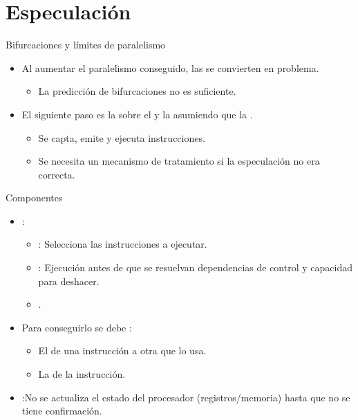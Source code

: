 \section{Especulación}

\begin{frame}[t]{Bifurcaciones y límites de paralelismo}
\begin{itemize}
  \item Al aumentar el paralelismo conseguido, las  se convierten en problema.
    \begin{itemize}
      \item La predicción de bifurcaciones no es suficiente.
    \end{itemize}

  \item El siguiente paso es la  sobre el 
         y la  
        asumiendo que la .
    \begin{itemize}
      \item Se capta, emite y ejecuta instrucciones.
      \item Se necesita un mecanismo de tratamiento si la especulación no era correcta.
    \end{itemize}
\end{itemize}
\end{frame}

\begin{frame}[t]{Componentes}
\begin{itemize}
  \item {}:
    \begin{itemize}
      \item {}: Selecciona las instrucciones a ejecutar.
      \item {}: Ejecución antes de que se resuelvan dependencias de control y capacidad para deshacer.
      \item {}.
    \end{itemize}

  \item Para conseguirlo se debe :
    \begin{itemize}
      \item El  de una instrucción a otra que lo usa.
      \item La  de la instrucción.
    \end{itemize}

  \item {}:No se actualiza el estado del procesador 
        (registros/memoria) hasta que no se tiene confirmación.
\end{itemize}
\end{frame}

